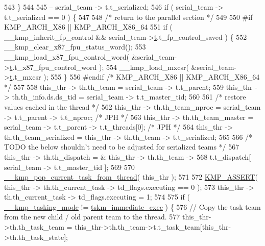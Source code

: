 \begin{DoxyCode}
{543     \}
544 
545     -- serial\_team -> t.t\_serialized;
546     \textcolor{keywordflow}{if} ( serial\_team -> t.t\_serialized == 0 ) \{
547 
548         \textcolor{comment}{/* return to the parallel section */}
549 
550 \textcolor{preprocessor}{#if KMP\_ARCH\_X86 || KMP\_ARCH\_X86\_64}
551 \textcolor{preprocessor}{}        \textcolor{keywordflow}{if} ( \_\_kmp\_inherit\_fp\_control && serial\_team->\hyperlink{unionkmp__team_a87cf4571108a61b446e809094f8c0362}{t}.t\_fp\_control\_saved ) \{
552             \_\_kmp\_clear\_x87\_fpu\_status\_word();
553             \_\_kmp\_load\_x87\_fpu\_control\_word( &serial\_team->\hyperlink{unionkmp__team_a87cf4571108a61b446e809094f8c0362}{t}.t\_x87\_fpu\_control\_word );
554             \_\_kmp\_load\_mxcsr( &serial\_team->\hyperlink{unionkmp__team_a87cf4571108a61b446e809094f8c0362}{t}.t\_mxcsr );
555         \}
556 \textcolor{preprocessor}{#endif }\textcolor{comment}{/* KMP\_ARCH\_X86 || KMP\_ARCH\_X86\_64 */}\textcolor{preprocessor}{}
557 \textcolor{preprocessor}{}
558         this\_thr -> th.th\_team           = serial\_team -> t.t\_parent;
559         this\_thr -> th.th\_info.ds.ds\_tid = serial\_team -> t.t\_master\_tid;
560 
561         \textcolor{comment}{/* restore values cached in the thread */}
562         this\_thr -> th.th\_team\_nproc     = serial\_team -> t.t\_parent -> t.t\_nproc;          \textcolor{comment}{/*  JPH */}
563         this\_thr -> th.th\_team\_master    = serial\_team -> t.t\_parent -> t.t\_threads[0];     \textcolor{comment}{/* JPH */}
564         this\_thr -> th.th\_team\_serialized = this\_thr -> th.th\_team -> t.t\_serialized;
565 
566         \textcolor{comment}{/* TODO the below shouldn't need to be adjusted for serialized teams */}
567         this\_thr -> th.th\_dispatch       = & this\_thr -> th.th\_team ->
568             t.t\_dispatch[ serial\_team -> t.t\_master\_tid ];
569 
570         \hyperlink{kmp_8h_ae3470280dc2ee8dde4f95debde6575e4}{\_\_kmp\_pop\_current\_task\_from\_thread}( this\_thr );
571 
572         \hyperlink{kmp__debug_8h_a5323a368e8ba273b17c46906dd9ec78c}{KMP\_ASSERT}( this\_thr -> th.th\_current\_task -> td\_flags.executing == 0 );
573         this\_thr -> th.th\_current\_task -> td\_flags.executing = 1;
574 
575         \textcolor{keywordflow}{if} ( \hyperlink{kmp_8h_a39e87c52fb75a615c2564a822a013a5a}{\_\_kmp\_tasking\_mode} != \hyperlink{kmp_8h_aad1bdfbfac136cfd92611bcee79ca3f2af827998cf4eb3f61723edc4943b86c98}{tskm\_immediate\_exec} ) \{
576             \textcolor{comment}{// Copy the task team from the new child / old parent team to the thread.}
577             this\_thr->th.th\_task\_team = this\_thr->th.th\_team->t.t\_task\_team[this\_thr->th.th\_task\_state];
}
\end{DoxyCode}
